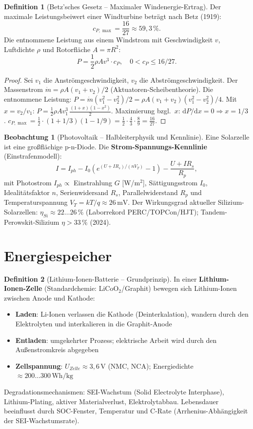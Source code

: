 ﻿\documentclass[a4paper,12pt]{report}
\theoremstyle{definition}
\newtheorem{definition}{Definition}
\newtheorem{beobachtung}{Beobachtung}
\begin{document}
\begin{definition}[Betz'sches Gesetz -- Maximaler Windenergie-Ertrag]
Der maximale Leistungsbeiwert einer Windturbine beträgt nach Betz (1919):
\[
  c_{P,\max} = \frac{16}{27} \approx 59{,}3\,\%.
\]
Die entnommene Leistung aus einem Windstrom mit Geschwindigkeit $v$,
Luftdichte $\rho$ und Rotorfläche $A = \pi R^2$:
\[
  P = \frac{1}{2}\rho A v^3 \cdot c_P, \quad 0 < c_P \le 16/27.
\]
\end{definition}
\begin{proof}
Sei $v_1$ die Anströmgeschwindigkeit, $v_2$ die Abströmgeschwindigkeit.
Der Massenstrom $\dot{m} = \rho A (v_1+v_2)/2$ (Aktuatoren-Scheibentheorie).
Die entnommene Leistung:
$P = \dot{m}(v_1^2 - v_2^2)/2 = \rho A (v_1+v_2)(v_1^2-v_2^2)/4$.
Mit $x = v_2/v_1$: $P = \frac{1}{2}\rho A v_1^3\,\frac{(1+x)(1-x^2)}{2}$.
Maximierung bzgl.\ $x$: $\mathrm{d}P/\mathrm{d}x = 0 \Rightarrow x = 1/3$.
$c_{P,\max} = \frac{1}{2}\cdot(1+1/3)(1-1/9) = \frac{1}{2}\cdot\frac{4}{3}\cdot\frac{8}{9} = \frac{16}{27}$.
\end{proof}

\begin{beobachtung}[Photovoltaik -- Halbleiterphysik und Kennlinie]
Eine Solarzelle ist eine groß\-flächige p-n-Diode.
Die \textbf{Strom-Spannungs-Kennlinie} (Einstrafenmodell):
\[
  I = I_{ph} - I_0\left(e^{(U + IR_s)/(nV_T)} - 1\right) - \frac{U+IR_s}{R_p},
\]
mit Photostrom $I_{ph} \propto$ Einstrahlung $G$ [W/m$^2$],
Sättigungsstrom $I_0$, Idealitätsfaktor $n$, Serienwidersand $R_s$,
Parallelwiderstand $R_p$ und Temperaturspannung $V_T = kT/q \approx 26\,\mathrm{mV}$.
Der Wirkungsgrad aktueller Silizium-Solarzellen:
$\eta_{Si} \approx 22\ldots26\,\%$ (Laborrekord PERC/TOPCon/HJT);
Tandem-Perowskit-Silizium $\eta > 33\,\%$ (2024).
\end{beobachtung}

\section{Energiespeicher}

\begin{definition}[Lithium-Ionen-Batterie -- Grundprinzip]
In einer \textbf{Lithium-Ionen-Zelle} (Standardchemie: LiCoO$_2$/Graphit)
bewegen sich Lithium-Ionen zwischen Anode und Kathode:
\begin{itemize}
    \item[-] \textbf{Laden}: Li-Ionen verlassen die Kathode (Deinterkalation),
          wandern durch den Elektrolyten und interkalieren in die Graphit-Anode
    \item[-] \textbf{Entladen}: umgekehrter Prozess; elektrische Arbeit wird
          durch den Außenstromkreis abgegeben
    \item[-] \textbf{Zellspannung}: $U_{Zelle} \approx 3{,}6\,\mathrm{V}$
          (NMC, NCA); Energiedichte $\approx 200\ldots300\,\mathrm{Wh/kg}$
\end{itemize}
Degradationsmechanismen: SEI-Wachstum (Solid Electrolyte Interphase),
Lithium-Plating, aktiver Materialverlust, Elektrolytabbau.
Lebensdauer beeinflusst durch SOC-Fenster, Temperatur und C-Rate
(Arrhenius-Abhängigkeit der SEI-Wachstumsrate).
\end{definition}
\end{document}
